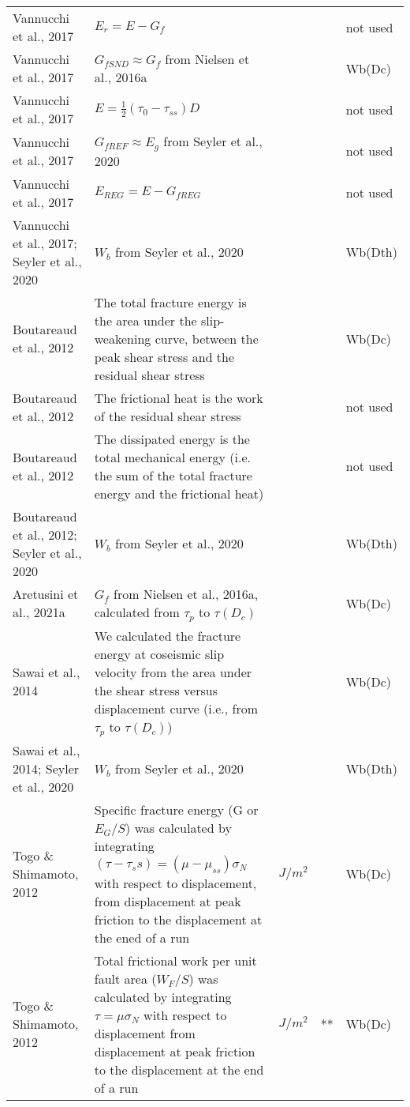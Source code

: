 \documentclass{article}
\begin{document}
\begin{longtable}{|p{4 cm}|p{8 cm}|p{1.25 cm}|p{1.25 cm}|p{1.5 cm}|}
Vannucchi et al., 2017 & \( \displaystyle E_r = E - G_f \) & & & not used \\
Vannucchi et al., 2017 & \( \displaystyle G_{fSND} \approx G_f\) from Nielsen et al., 2016a & & & Wb(Dc) \\
Vannucchi et al., 2017 & \( \displaystyle E = \frac{1}{2} (\tau_0 - \tau_{ss}) D \) & & & not used \\
Vannucchi et al., 2017 & \( \displaystyle G_{fREF} \approx E_g \) from Seyler et al., 2020 & & & not used \\
Vannucchi et al., 2017 & \( \displaystyle E_{REG} = E - G_{fREG} \) & & & not used \\
Vannucchi et al., 2017; Seyler et al., 2020 & \( \displaystyle W_b \) from Seyler et al., 2020 & & & Wb(Dth) \\
Boutareaud et al., 2012 & The total fracture energy is the area under the slip-weakening curve, between the peak shear stress and the residual shear stress & & & Wb(Dc) \\
Boutareaud et al., 2012 & The frictional heat is the work of the residual shear stress & & & not used \\
Boutareaud et al., 2012 & The dissipated energy is the total mechanical energy (i.e. the sum of the total fracture energy and the frictional heat) & & & not used \\
Boutareaud et al., 2012; Seyler et al., 2020 & \( \displaystyle W_b \) from Seyler et al., 2020 & & & Wb(Dth) \\
Aretusini et al., 2021a & \( \displaystyle G_f\) from Nielsen et al., 2016a, calculated from $\tau_p$ to $\tau(D_c)$ & & & Wb(Dc) \\
Sawai et al., 2014 & We calculated the fracture energy at coseismic slip velocity from the area under the shear stress versus displacement curve (i.e., from $\tau_p$ to $\tau(D_c)$) & & & Wb(Dc) \\
Sawai et al., 2014; Seyler et al., 2020 & \( \displaystyle W_b \) from Seyler et al., 2020 & & & Wb(Dth) \\
Togo \& Shimamoto, 2012 & Specific fracture energy (G or $E_G/S$) was calculated by integrating $(\tau-\tau_ss) = (\mu - \mu_{ss})\sigma_N$ with respect to displacement, from displacement at peak friction to the displacement at the ened of a run & $J/m^2$ & & Wb(Dc) \\
Togo \& Shimamoto, 2012 & Total frictional work per unit fault area ($W_F/S$) was calculated by integrating $\tau = \mu \sigma_N$ with respect to displacement from displacement at peak friction to the displacement at the end of a run & $J/m^2$ & ** & Wb(Dc) \\

\end{longtable}
\end{document}
